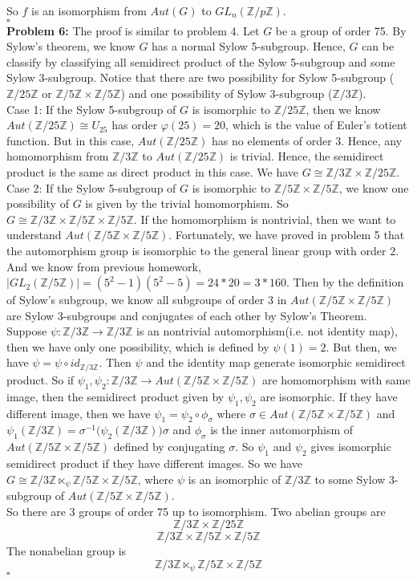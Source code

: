 \documentclass[12pt]{amsart}
\newcommand{\Z}{\mathbb{Z}}
\begin{document}
So $f$ is an isomorphism from $Aut(G)$ to $GL_n(\Z/p\Z)$.
\\\phantom{qed}\hfill$\square$\\
\textbf{Problem 6:} The proof is similar to problem 4. Let $G$ be a group of order 75. By Sylow's theorem, we know $G$ has a normal Sylow 5-subgroup. Hence, $G$ can be classify by classifying all semidirect product of the Sylow 5-subgroup and some Sylow 3-subgroup. Notice that there are two possibility for Sylow 5-subgroup ($\Z/25\Z$ or $\Z/5\Z\times \Z/5\Z$) and one possibility of Sylow 3-subgroup ($\Z/3\Z$).\\
Case 1: If the Sylow 5-subgroup of $G$ is isomorphic to $\Z/25\Z$, then we know $Aut(\Z/25\Z)\cong U_{25}$ has order $\varphi(25)=20$, which is the value of Euler's totient function. But in this case, $Aut(\Z/25\Z)$ has no elements of order 3. Hence, any homomorphism from $\Z/3\Z$ to $Aut(\Z/25\Z)$ is trivial. Hence, the semidirect product is the same as direct product in this case. We have $G\cong \Z/3\Z\times \Z/25\Z$.\\
Case 2: If the Sylow 5-subgroup of $G$ is isomorphic to $\Z/5\Z\times \Z/5\Z$, we know one possibility of $G$ is given by the trivial homomorphism. So $G\cong \Z/3\Z\times \Z/5\Z \times \Z/5\Z$. If the homomorphism is nontrivial, then we want to understand $Aut(\Z/5\Z\times \Z/5\Z)$. Fortunately, we have proved in problem 5 that the automorphism group is isomorphic to the general linear group with order 2. And we know from previous homework, $|GL_2(\Z/5\Z)|=(5^2-1)(5^2-5)=24*20=3*160$. Then by the definition of Sylow's subgroup, we know all subgroups of order 3 in $Aut(\Z/5\Z\times \Z/5\Z)$ are Sylow 3-subgroups and conjugates of each other by Sylow's Theorem. Suppose $\psi:\Z/3\Z\to \Z/3\Z$ is an nontrivial automorphism(i.e. not identity map), then we have only one possibility, which is defined by $\psi(1)=2$. But then, we have $\psi=\psi\circ id_{\Z/3\Z}$. Then $\psi
$ and the identity map generate isomorphic semidirect product. So if $\psi_1,\psi_2: \Z/3\Z\to Aut(\Z/5\Z\times \Z/5\Z)$ are homomorphism with same image, then the semidirect product given by $\psi_1,\psi_2$ are isomorphic. If they have different image, then we have 
$\psi_1=\psi_2\circ \phi_\sigma$ where $\sigma\in Aut(\Z/5\Z\times \Z/5\Z)$ and $\psi_1(\Z/3\Z)=\sigma^{-1}\big(\psi_2(\Z/3\Z)\big)\sigma$ and $\phi_\sigma$ is the inner automorphism of $Aut(\Z/5\Z\times \Z/5\Z)$ defined by conjugating $\sigma$. So $\psi_1$ and $\psi_2$ gives isomorphic semidirect product if they have different images. So we have $G\cong \Z/3\Z \ltimes_\psi \Z/5\Z\times \Z/5\Z$, where $\psi$ is an isomorphic of $\Z/3\Z$ to some Sylow 3-subgroup of $Aut(\Z/5\Z\times \Z/5\Z)$.\\
So there are 3 groups of order 75 up to isomorphism. Two abelian groups are 
\[\Z/3\Z\times \Z/25\Z\]
\[\Z/3\Z\times \Z/5\Z \times \Z/5\Z\]
The nonabelian group is 
\[\Z/3\Z \ltimes_\psi \Z/5\Z\times \Z/5\Z\]
\phantom{qed}\hfill$\square$\\
\end{document}
